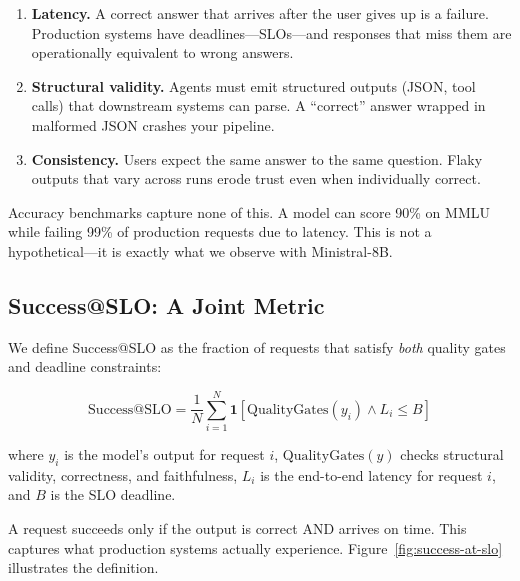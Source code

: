 \documentclass[11pt]{article}
\begin{document}
\begin{enumerate}[leftmargin=12pt]
    \item \textbf{Latency.} A correct answer that arrives after the user gives up is a failure. Production systems have deadlines---SLOs---and responses that miss them are operationally equivalent to wrong answers.

    \item \textbf{Structural validity.} Agents must emit structured outputs (JSON, tool calls) that downstream systems can parse. A ``correct'' answer wrapped in malformed JSON crashes your pipeline.

    \item \textbf{Consistency.} Users expect the same answer to the same question. Flaky outputs that vary across runs erode trust even when individually correct.
\end{enumerate}

Accuracy benchmarks capture none of this.
A model can score 90\% on MMLU while failing 99\% of production requests due to latency.
This is not a hypothetical---it is exactly what we observe with Ministral-8B.

\subsection{Success@SLO: A Joint Metric}

We define Success@SLO as the fraction of requests that satisfy \emph{both} quality gates and deadline constraints:

\begin{equation}
\text{Success@SLO} = \frac{1}{N} \sum_{i=1}^{N} \mathbf{1}\left[\text{QualityGates}(y_i) \wedge L_i \leq B\right]
\label{eq:success-at-slo}
\end{equation}

where $y_i$ is the model's output for request $i$, $\text{QualityGates}(y)$ checks structural validity, correctness, and faithfulness, $L_i$ is the end-to-end latency for request $i$, and $B$ is the SLO deadline.

A request succeeds only if the output is correct AND arrives on time.
This captures what production systems actually experience.
Figure~\ref{fig:success-at-slo} illustrates the definition.
\end{document}
